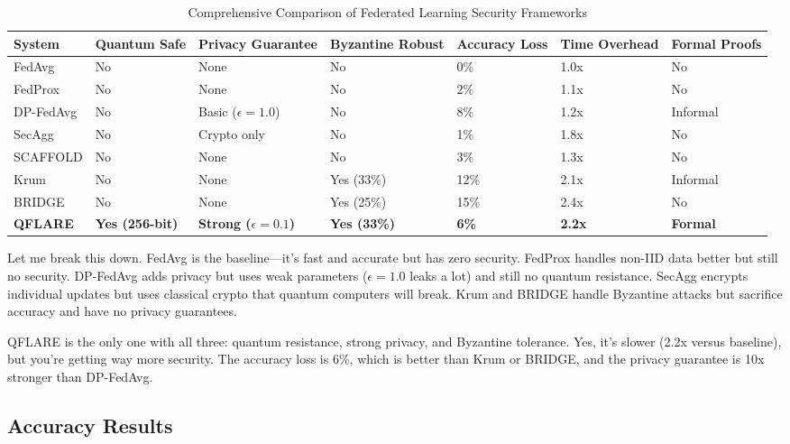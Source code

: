 \documentclass[onecolumn,11pt]{article}
\begin{document}
\begin{table}[htbp]
\centering
\caption{Comprehensive Comparison of Federated Learning Security Frameworks}
\label{tab:comprehensive_comparison}
\scriptsize
\begin{tabular}{@{}p{2cm}p{1.3cm}p{1.3cm}p{1.3cm}p{1.3cm}p{1.3cm}p{1.3cm}@{}}
\toprule
\textbf{System} & \textbf{Quantum Safe} & \textbf{Privacy Guarantee} & \textbf{Byzantine Robust} & \textbf{Accuracy Loss} & \textbf{Time Overhead} & \textbf{Formal Proofs} \\
\midrule
FedAvg & No & None & No & 0\% & 1.0x & No \\
FedProx & No & None & No & 2\% & 1.1x & No \\
DP-FedAvg & No & Basic ($\epsilon=1.0$) & No & 8\% & 1.2x & Informal \\
SecAgg & No & Crypto only & No & 1\% & 1.8x & No \\
SCAFFOLD & No & None & No & 3\% & 1.3x & No \\
Krum & No & None & Yes (33\%) & 12\% & 2.1x & Informal \\
BRIDGE & No & None & Yes (25\%) & 15\% & 2.4x & No \\
\midrule
\textbf{QFLARE} & \textbf{Yes (256-bit)} & \textbf{Strong ($\epsilon=0.1$)} & \textbf{Yes (33\%)} & \textbf{6\%} & \textbf{2.2x} & \textbf{Formal} \\
\bottomrule
\end{tabular}
\end{table}

Let me break this down. FedAvg is the baseline—it's fast and accurate but has zero security. FedProx handles non-IID data better but still no security. DP-FedAvg adds privacy but uses weak parameters ($\epsilon=1.0$ leaks a lot) and still no quantum resistance. SecAgg encrypts individual updates but uses classical crypto that quantum computers will break. Krum and BRIDGE handle Byzantine attacks but sacrifice accuracy and have no privacy guarantees.

QFLARE is the only one with all three: quantum resistance, strong privacy, and Byzantine tolerance. Yes, it's slower (2.2x versus baseline), but you're getting way more security. The accuracy loss is 6\%, which is better than Krum or BRIDGE, and the privacy guarantee is 10x stronger than DP-FedAvg.

\subsection{Accuracy Results}
\end{document}
